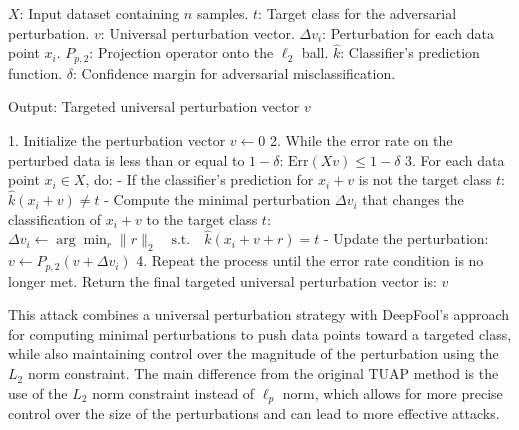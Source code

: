 $X$: Input dataset containing $n$ samples.
$t$: Target class for the adversarial perturbation.
$v$: Universal perturbation vector.
$\Delta v_i$: Perturbation for each data point $x_i$.
$P_{p, 2}$: Projection operator onto the $\ell_2$ ball.
$\hat{k}$: Classifier's prediction function.
$\delta$: Confidence margin for adversarial misclassification.

Output: Targeted universal perturbation vector $v$

1. Initialize the perturbation vector $v \leftarrow 0$
2. While the error rate on the perturbed data is less than or equal to $1 - \delta$:
$\text{Err}(Xv) \leq 1 - \delta$
3. For each data point $x_i \in X$, do:
    - If the classifier's prediction for $x_i + v$ is not the target class $t$:
        $\hat{k}(x_i + v) \neq t$
        - Compute the minimal perturbation $\Delta v_i$ that changes the classification of $x_i + v$ to the target class $t$:
            $\Delta v_i \leftarrow \arg \min_{r} \|r\|_2 \quad \text{s.t.} \quad \hat{k}(x_i + v + r) = t$
        - Update the perturbation:
            $v \leftarrow P_{p, 2}(v + \Delta v_i)$
4. Repeat the process until the error rate condition is no longer met.
Return the final targeted universal perturbation vector is:
$v$

This attack combines a universal perturbation strategy with DeepFool's approach for computing minimal perturbations to push data points toward a targeted class, while also maintaining control over the magnitude of the perturbation using the $L_2$ norm constraint. The main difference from the original TUAP method is the use of the $L_2$ norm constraint instead of $\ell_p$ norm, which allows for more precise control over the size of the perturbations and can lead to more effective attacks.